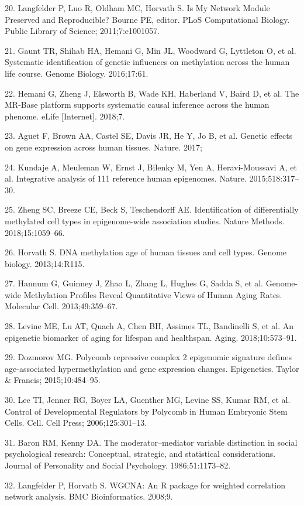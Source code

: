 \documentclass[]{bmcart}
\begin{document}
20. Langfelder P, Luo R, Oldham MC, Horvath S. Is My Network Module
Preserved and Reproducible? Bourne PE, editor. PLoS Computational
Biology. Public Library of Science; 2011;7:e1001057.

21. Gaunt TR, Shihab HA, Hemani G, Min JL, Woodward G, Lyttleton O, et
al. Systematic identification of genetic influences on methylation
across the human life course. Genome Biology. 2016;17:61.

22. Hemani G, Zheng J, Elsworth B, Wade KH, Haberland V, Baird D, et al.
The MR-Base platform supports systematic causal inference across the
human phenome. eLife {[}Internet{]}. 2018;7.

23. Aguet F, Brown AA, Castel SE, Davis JR, He Y, Jo B, et al. Genetic
effects on gene expression across human tissues. Nature. 2017;

24. Kundaje A, Meuleman W, Ernst J, Bilenky M, Yen A, Heravi-Moussavi A,
et al. Integrative analysis of 111 reference human epigenomes. Nature.
2015;518:317--30.

25. Zheng SC, Breeze CE, Beck S, Teschendorff AE. Identification of
differentially methylated cell types in epigenome-wide association
studies. Nature Methods. 2018;15:1059--66.

26. Horvath S. DNA methylation age of human tissues and cell types.
Genome biology. 2013;14:R115.

27. Hannum G, Guinney J, Zhao L, Zhang L, Hughes G, Sadda S, et al.
Genome-wide Methylation Profiles Reveal Quantitative Views of Human
Aging Rates. Molecular Cell. 2013;49:359--67.

28. Levine ME, Lu AT, Quach A, Chen BH, Assimes TL, Bandinelli S, et al.
An epigenetic biomarker of aging for lifespan and healthspan. Aging.
2018;10:573--91.

29. Dozmorov MG. Polycomb repressive complex 2 epigenomic signature
defines age-associated hypermethylation and gene expression changes.
Epigenetics. Taylor \& Francis; 2015;10:484--95.

30. Lee TI, Jenner RG, Boyer LA, Guenther MG, Levine SS, Kumar RM, et
al. Control of Developmental Regulators by Polycomb in Human Embryonic
Stem Cells. Cell. Cell Press; 2006;125:301--13.

31. Baron RM, Kenny DA. The moderator--mediator variable distinction in
social psychological research: Conceptual, strategic, and statistical
considerations. Journal of Personality and Social Psychology.
1986;51:1173--82.

32. Langfelder P, Horvath S. WGCNA: An R package for weighted
correlation network analysis. BMC Bioinformatics. 2008;9.
\end{document}
